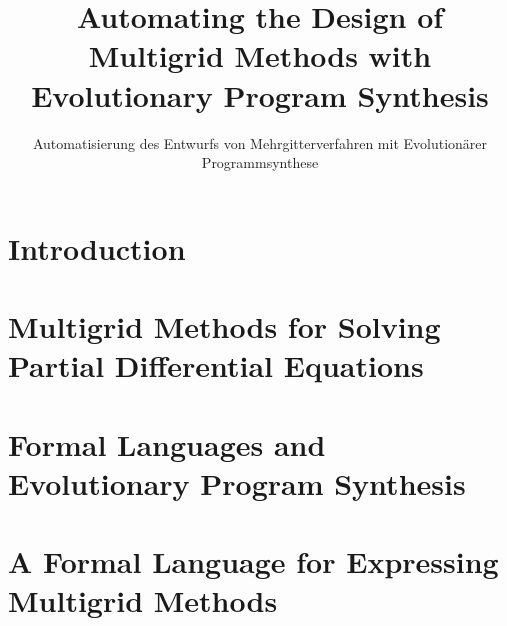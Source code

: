 \documentclass[
  paper = 17x24,
  language = english,
  acronym = nosymbol,
  acronymline = novertical,
  bibliography = combined,
  bibliographypart = all,
  titlesize = Huge,
  par = halfskip,
]{faupress}
\title{Automating the Design of Multigrid Methods with Evolutionary Program Synthesis}
\subtitle{Automatisierung des Entwurfs von Mehrgitterverfahren mit Evolutionärer Programmsynthese}
\institute{Lehrstuhl für Informatik 10}
\theoremstyle{definition}
\numberwithin{equation}{chapter}
\begin{document}

\frontmatter
  
  \makefacultytitle

  \begin{abstract}
    
  \end{abstract}
  \begin{zusammenfassung}
    
  \end{zusammenfassung}

  \tableofcontents

\mainmatter

\chapter{Introduction}


\chapter{Multigrid Methods for Solving Partial Differential Equations}
  
  
  
\chapter{Formal Languages and Evolutionary Program Synthesis}
\label{chapter:formal-languages-and-gp}
  
  
\chapter{A Formal Language for Expressing Multigrid Methods}
\label{chapter:multigrid-formal-language}
  
\end{document}
